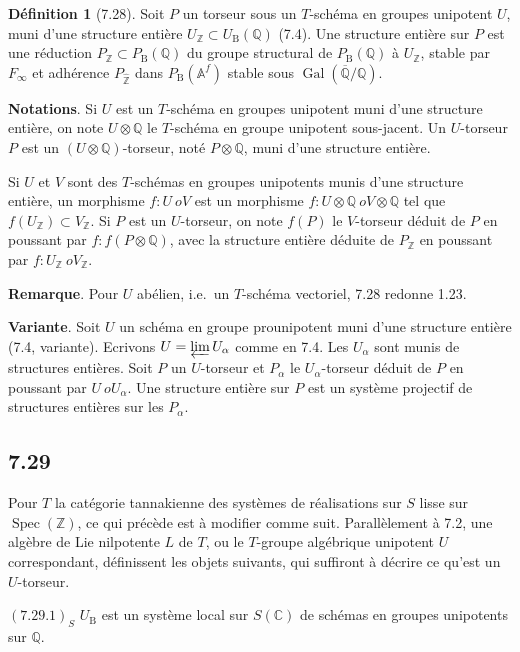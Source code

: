 \documentclass[12pt,a4paper]{article}
\theoremstyle{plain}
\theoremstyle{definition}
\newtheorem{definition}[theorem]{D\'efinition}
\theoremstyle{remark}
\DeclareMathOperator{\Spec}{Spec}
\DeclareMathOperator{\Gal}{Gal}
\newcommand{\B}{\mathrm{B}}
\newcommand{\Z}{\mathbb{Z}}
\newcommand{\Q}{\mathbb{Q}}
\newcommand{\C}{\mathbb{C}}
\newcommand{\A}{\mathbb{A}}
\begin{document}
\begin{definition}[7.28]\label{def:7.28}
Soit $P$ un torseur sous un $T$-sch\'ema en groupes unipotent $U$, muni d'une structure enti\`ere $U_\Z \subset U_\B(\Q)$ (7.4). Une structure enti\`ere sur $P$ est une r\'eduction $P_\Z \subset P_\B(\Q)$ du groupe structural de $P_\B(\Q)$ \`a $U_\Z$, stable par $F_\infty$ et adh\'erence $P_{\hat{\Z}}$ dans $P_\B(\A^f)$ stable sous $\Gal(\overline{\Q}/\Q)$.
\end{definition}

\textbf{Notations}. Si $U$ est un $T$-sch\'ema en groupes unipotent muni d'une structure enti\`ere, on note $U \otimes \Q$ le $T$-sch\'ema en groupe unipotent sous-jacent. Un $U$-torseur $P$ est un $(U \otimes \Q)$-torseur, not\'e $P \otimes \Q$, muni d'une structure enti\`ere.

Si $U$ et $V$ sont des $T$-sch\'emas en groupes unipotents munis d'une structure enti\`ere, un morphisme $f: U \	o V$ est un morphisme $f: U \otimes \Q \	o V \otimes \Q$ tel que $f(U_\Z) \subset V_\Z$. Si $P$ est un $U$-torseur, on note $f(P)$ le $V$-torseur d\'eduit de $P$ en poussant par $f: f(P \otimes \Q)$, avec la structure enti\`ere d\'eduite de $P_\Z$ en poussant par $f: U_\Z \	o V_\Z$.

\textbf{Remarque}. Pour $U$ ab\'elien, i.e.~un $T$-sch\'ema vectoriel, 7.28 redonne 1.23.

\textbf{Variante}. Soit $U$ un sch\'ema en groupe prounipotent muni d'une structure enti\`ere (7.4, variante). Ecrivons $U = 
\varprojlim U_\alpha$ comme en 7.4. Les $U_\alpha$ sont munis de structures enti\`eres. Soit $P$ un $U$-torseur et $P_\alpha$ le $U_\alpha$-torseur d\'eduit de $P$ en poussant par $U \	o U_\alpha$. Une structure enti\`ere sur $P$ est un syst\`eme projectif de structures enti\`eres sur les $P_\alpha$.

\subsection*{7.29}
Pour $T$ la cat\'egorie tannakienne des syst\`emes de r\'ealisations sur $S$ lisse sur $\Spec(\Z)$, ce qui pr\'ec\`ede est \`a modifier comme suit. Parall\`element \`a 7.2, une alg\`ebre de Lie nilpotente $L$ de $T$, ou le $T$-groupe alg\'ebrique unipotent $U$ correspondant, d\'efinissent les objets suivants, qui suffiront \`a d\'ecrire ce qu'est un $U$-torseur.

$(7.29.1)_S$ $U_\B$ est un syst\`eme local sur $S(\C)$ de sch\'emas en groupes unipotents sur $\Q$.
\end{document}
